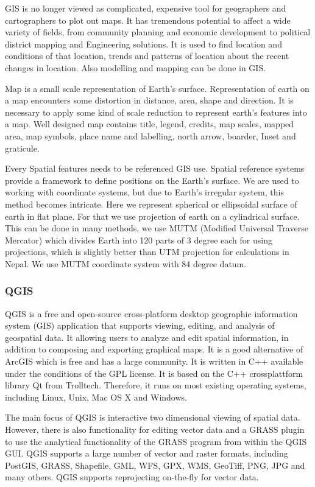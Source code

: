 GIS is no longer viewed as complicated, expensive tool for geographers and cartographers to plot out maps. It has tremendous potential to affect a wide variety of fields, from community planning and economic development to political district mapping and Engineering solutions. It is used to find location and conditions of that location, trends and patterns of location about the recent changes in location. Also modelling and mapping can be done in GIS.

Map is a small scale representation of Earth’s surface. Representation of earth on a map encounters some distortion in distance, area, shape and direction. It is necessary to apply some kind of scale reduction to represent earth’s features into a map. Well designed map contains title, legend, credits, map scales, mapped area, map symbols, place name and labelling, north arrow, boarder, Inset and graticule.

Every Spatial features needs to be referenced GIS use. Spatial reference systems provide a framework to define positions on the Earth’s surface. We are used to working with coordinate systems, but due to Earth’s irregular system, this method becomes intricate. Here we represent spherical or ellipsoidal surface of earth in flat plane. For that we use projection of earth on a cylindrical surface. This can be done in many methods, we use MUTM (Modified Universal Traverse Mercator) which divides Earth into 120 parts of 3 degree each for using projections, which is slightly better than UTM projection for calculations in Nepal. We use MUTM coordinate system with 84 degree datum.

\subsubsection{QGIS}
QGIS is a free and open-source cross-platform desktop geographic information system (GIS) application that supports viewing, editing, and analysis of geospatial data. It allowing users to analyze and edit spatial information, in addition to composing and exporting graphical maps. It is a good alternative of ArcGIS which is free and has a large community. It is written in C++ available under the conditions of the GPL license. It is based on the C++ crossplattform library Qt from Trolltech. Therefore, it runs on most existing operating systems, including Linux, Unix, Mac OS X and Windows. 

The main focus of QGIS is interactive two dimensional viewing of spatial data. However, there is also functionality for editing vector data and a GRASS plugin to use the analytical functionality of the GRASS program from within the QGIS GUI. QGIS supports a large number of vector and raster formats, including PostGIS, GRASS, Shapefile, GML, WFS, GPX, WMS, GeoTiff, PNG, JPG and many others. QGIS supports reprojecting on-the-fly for vector data.
